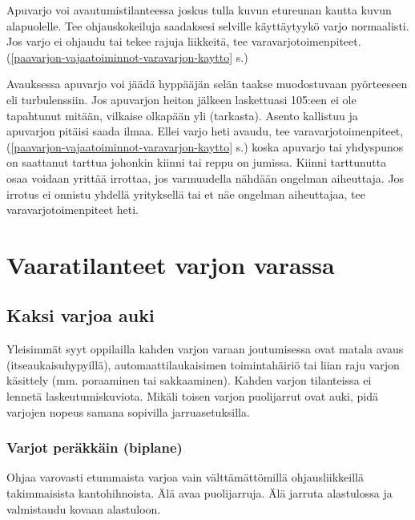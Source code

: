 Apuvarjo voi avautumistilanteessa joskus tulla kuvun etureunan kautta kuvun alapuolelle. Tee ohjauskokeiluja saadaksesi selville käyttäytyykö varjo normaalisti. Jos varjo ei ohjaudu tai tekee rajuja liikkeitä, tee varavarjotoimenpiteet. (\ref{paavarjon-vajaatoiminnot-varavarjon-kaytto} s.\pageref{paavarjon-vajaatoiminnot-varavarjon-kaytto}) 


Avauksessa apuvarjo voi jäädä hyppääjän selän taakse muodostuvaan pyörteeseen eli turbulenssiin. Jos apuvarjon heiton jälkeen laskettuasi 105:een ei ole tapahtunut mitään, vilkaise olkapään yli (tarkasta). Asento kallistuu ja apuvarjon pitäisi saada ilmaa. Ellei varjo heti avaudu, tee varavarjotoimenpiteet, (\ref{paavarjon-vajaatoiminnot-varavarjon-kaytto} s.\pageref{paavarjon-vajaatoiminnot-varavarjon-kaytto}) koska apuvarjo tai yhdyspunos on saattanut tarttua johonkin kiinni tai reppu on jumissa. Kiinni tarttunutta osaa voidaan yrittää irrottaa, jos varmuudella nähdään ongelman aiheuttaja. Jos irrotus ei onnistu yhdellä yrityksellä tai et näe ongelman aiheuttajaa, tee varavarjotoimenpiteet heti. 

\section{ Vaaratilanteet varjon varassa }
\label{mahdolliset-vaaratilanteet-vaaratilanteet-varjon-varassa}

\subsection{ Kaksi varjoa auki }
\label{mahdolliset-vaaratilanteet-kaksi-varjoa-auki}


Yleisimmät syyt oppilailla kahden varjon varaan joutumisessa ovat matala avaus (itseaukaisuhypyillä), automaattilaukaisimen toimintahäiriö tai liian raju varjon käsittely (mm. poraaminen tai sakkaaminen). Kahden varjon tilanteissa ei lennetä laskeutumiskuviota. Mikäli toisen varjon puolijarrut ovat auki, pidä varjojen nopeus samana sopivilla jarruasetuksilla. 


\subsubsection{ Varjot peräkkäin (biplane) }
\label{mahdolliset-vaaratilanteet-varjot-perakkain-biplane}


Ohjaa varovasti etummaista varjoa vain välttämättömillä ohjausliikkeillä takimmaisista kantohihnoista. Älä avaa puolijarruja. Älä jarruta alastulossa ja valmistaudu kovaan alastuloon. 


